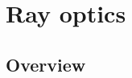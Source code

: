 \renewcommand{\lastmod}{September 18, 2023}
\renewcommand{\chapterauthors}{Markus Lippitz}

\chapter{Ray optics}

\section{Overview}



\printbibliography[segment=\therefsegment,heading=subbibliography]
